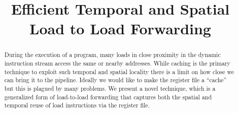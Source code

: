 \documentclass{sig-alternate}
\title{Efficient Temporal and Spatial Load to Load Forwarding}
\begin{document}
\maketitle
\thispagestyle{firstpage}
\pagestyle{plain}




\begin{abstract}

During the execution of a program, many loads in close proximity in the dynamic instruction stream access the same or nearby addresses. While caching is the primary technique to exploit such temporal and spatial locality there is a limit on how close we can bring it to the pipeline. Ideally we would like to make the register file a ``cache'' but this is plagued by many problems.
We present a novel technique, which is a generalized form of load-to-load forwarding that captures both the spatial and temporal reuse of load instructions via the register file.


\end{abstract}
\end{document}
